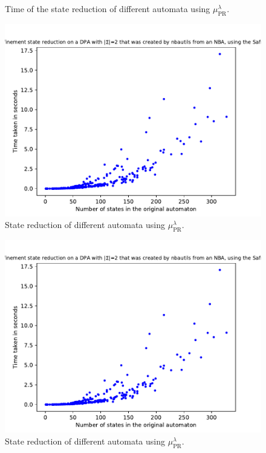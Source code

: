 \begin{figure}
\begin{minipage}{0.49\textwidth}
		\caption{Time of the state reduction of different automata using $\mu_\text{PR}^\lambda$.}
		\label{fig:pr:empirical_time}
	\end{minipage}
\end{figure}

\begin{figure}
	\centering
	\includegraphics[page=6,height=.4\textheight]{../data/analysis/path_refinement/detnbaut_safra_ap1.pdf} 
	\caption{State reduction of different automata using $\mu_\text{PR}^\lambda$.}
	\label{fig:pr:empirical_safra_size_hist}
\end{figure}

\begin{figure}
	\centering
	\includegraphics[page=3,height=.4\textheight]{../data/analysis/path_refinement/detnbaut_safra_ap1.pdf} 
	\caption{State reduction of different automata using $\mu_\text{PR}^\lambda$.}
	\label{fig:pr:empirical_safra_reduct_rel}
\end{figure}

